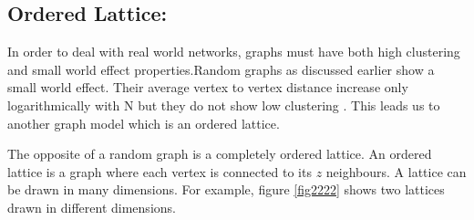 \subsection{Ordered Lattice:}
In order to deal with real world networks, graphs must have both high clustering and small world effect properties.Random graphs as discussed earlier show a small world effect. Their  average vertex to vertex distance increase only logarithmically with N but they do not show low clustering \citep{newman2000models}. This leads us to another graph model which is an ordered lattice.

The opposite of a random graph is a completely ordered lattice. An ordered lattice is a graph where each vertex is connected to its $z$ neighbours. A lattice can be drawn in many dimensions. For example, figure \ref{fig2222} shows two lattices drawn in different dimensions.
